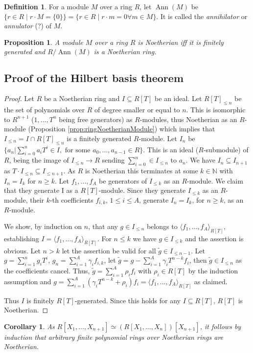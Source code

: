 \documentclass[DIV=14,parskip=half]{scrartcl}
\newtheorem{cor}{Corollary}[subsection]
\newtheorem{prop}{Proposition}[subsection]
\theoremstyle{definition}
\newtheorem{defi}{Definition}[subsection]
\newcommand{\N}{\mathbb{N}}
\newcommand{\longto}{\longrightarrow}
\newcommand{\Ann}{\operatorname{Ann}}
\begin{document}
\begin{defi}\label{def:annihilator}
 For a module $M$ over a ring $R$, let $\Ann(M)$ be $\{r\in R\mid r\cdot M = \{0\}\} = \{r\in R\mid r\cdot m = 0 \forall m\in M\}$. It is called the \emph{annihilator} or \emph{annulator} (?) of $M$.
\end{defi}
\begin{prop}
 A module $M$ over a ring $R$ is Noetherian iff it is finitely generated and $R/\Ann(M)$ is a Noetherian ring.
\end{prop}

\subsection{Proof of the Hilbert basis theorem}\label{sec:HilbertBasisProof}
\begin{proof}\label{proof:HilbertBasis}
Let $R$ be a Noetherian ring and $I\subseteq R[T]$ be an ideal. Let $R[T]_{\leq n}$ be the set of polynomials over $R$ of degree smaller or equal to $n$. This is isomorphic to $R^{n+1}$ ($1,\dots, T^n$ being free generators) as $R$-modules, thus Noetherian as an $R$-module (Proposition \ref{prop:ringNoetherianModule}) which implies that $I_{\leq n} = I \cap R[T]_{\leq n}$ is a finitely generated $R$-module. Let $I_n$ be $\{a_n|\sum_{i=0}^na_iT^i \in I, \text{ for some } a_0,\dots,a_{n-1}\in R\}$. This is an ideal ($R$-submodule) of $R$, being the image of $I_{\leq n} \longto R$ sending $\sum_{i=0}^n\in I_{\leq n}$ to $a_n$. We have $I_n\subseteq I_{n+1}$ as $T\cdot I_{\leq n}\subseteq I_{\leq n+1}$. As $R$ is Noetherian this terminates at some $k\in\N$ with $I_n = I_k$ for $n\geq k$. Let $f_1,\dots, f_A$ be generators of $I_{\leq k}$ as an $R$-module. We claim that they generate I as a $R[T]$-module. Since they generate $I_{\leq k}$ as an $R$-module, their $k$-th coefficients $f_{i,k}$, $1\leq i\leq A$, generate $I_n = I_k$, for $n\geq k$, as an $R$-module.

We show, by induction on $n$, that any $g\in I_{\leq n}$ belongs to $\langle f_1,\dots,f_A\rangle_{R[T]}$, establishing $I= \langle f_1,\dots, f_A\rangle_{R[T]}$. For $n\leq k$ we have $g\in I_{\leq k}$ and the assertion is obvious. Let $n>k$ let the assertion be valid for all $\tilde g \in I_{\leq n-1}$. Let $g=\sum_{i=1}^n g_iT^i$, $g_n = \sum_{i=1}^A \gamma_i f_{i,k}$, let $\tilde g = g-\sum_{i=1}^A \gamma_i T^{n-k} f_i$, then $\tilde g\in I_{\leq n}$ as the coefficients cancel. Thus, $\tilde g = \sum_{i=1}^A\rho_i f_i$ with $\rho_i\in R[T]$ by the induction assumption and $g=\sum_{i=1}^A(\gamma_i T^{n-k} +\rho_i) f_i = \langle f_1,\dots,f_A\rangle_{R[T]}$ as claimed.

Thus $I$ is finitely $R[T]$-generated. Since this holds for any $I\subseteq R[T]$, $R[T]$ is Noetherian.
\end{proof}
\begin{cor}\label{cor:NoetherianPolynomial}
 As $R[X_1,\dots,X_{n+1}] \simeq (R[X_1,\dots,X_n])[X_{n+1}]$, it follows by induction that arbitrary finite polynomial rings over Noetherian rings are Noetherian.
\end{cor}
\end{document}
